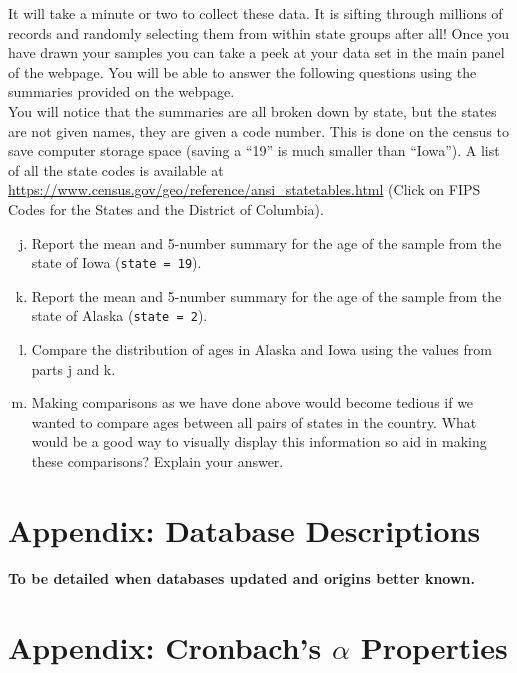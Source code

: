 \documentclass{article}\usepackage[]{graphicx}\usepackage[]{color}
\begin{document}
It will take a minute or two to collect these data. It is sifting through millions of records and randomly selecting them from within state groups after all! Once you have drawn your samples you can take a peek at your data set in the main panel of the webpage. You will be able to answer the following questions using the summaries provided on the webpage.  \\

You will notice that the summaries are all broken down by state, but the states are not given names, they are given a code number.  This is done on the census to save computer storage space (saving a ``19'' is much smaller than ``Iowa'').  A list of all the state codes is available at \url{https://www.census.gov/geo/reference/ansi\_statetables.html} (Click on FIPS Codes for the States and the District of Columbia).\\ 



\begin{enumerate}[(a)]
\setcounter{enumi}{9}
\item Report the mean and 5-number summary for the age of the sample from the state of Iowa (\texttt{state = 19}).
\item	Report the mean and 5-number summary for the age of the sample from the state of Alaska (\texttt{state = 2}).
\item	Compare the distribution of ages in Alaska and Iowa using the values from parts j and k.
\item	Making comparisons as we have done above would become tedious if we wanted to compare ages between all pairs of states in the country.  What would be a good way to visually display this information so aid in making these comparisons? Explain your answer.
\end{enumerate}


\section{Appendix: Database Descriptions}
\label{appendDB}

\textbf{To be detailed when databases updated and origins better known.}

\section{Appendix: Cronbach's $\alpha$ Properties}
\label{appendCronbach}
\end{document}

